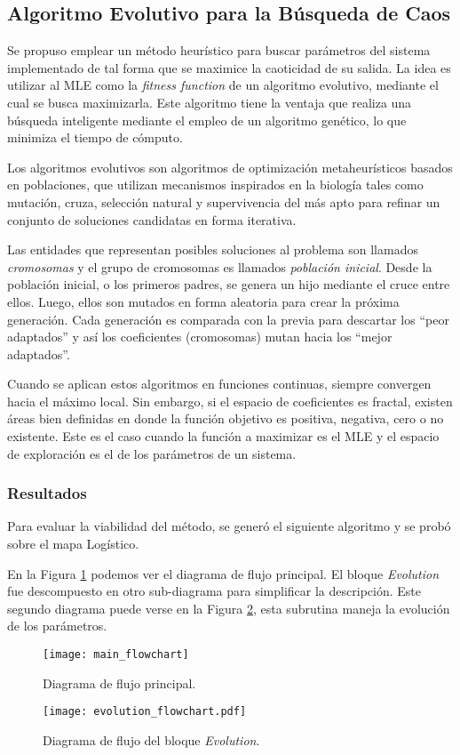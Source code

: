 \subsection{Algoritmo Evolutivo para la Búsqueda de Caos}

Se propuso emplear un método heurístico para buscar parámetros del sistema implementado de tal forma que se maximice la caoticidad de su salida.
La idea es utilizar al MLE como la \textit{fitness function} de un algoritmo evolutivo, mediante el cual se busca maximizarla.
Este algoritmo tiene la ventaja que realiza una búsqueda inteligente mediante el empleo de un algoritmo genético, lo que minimiza el tiempo de cómputo.

Los algoritmos evolutivos son algoritmos de optimización metaheurísticos basados en poblaciones, que utilizan mecanismos inspirados en la biología tales como mutación, cruza, selección natural y supervivencia del más apto para refinar un conjunto de soluciones candidatas en forma iterativa\cite{Weise2009}.

Las entidades que representan posibles soluciones al problema son llamados \textit{cromosomas} y el grupo de cromosomas es llamados \textit{población inicial}.
Desde la población inicial, o los primeros padres, se genera un hijo mediante el cruce entre ellos.
Luego, ellos son mutados en forma aleatoria para crear la próxima generación.
Cada generación es comparada con la previa para descartar los ``peor adaptados'' y así los coeficientes (cromosomas) mutan hacia los ``mejor adaptados''.

Cuando se aplican estos algoritmos en funciones continuas, siempre convergen hacia el máximo local.
Sin embargo, si el espacio de coeficientes es fractal, existen áreas bien definidas en donde la función objetivo es positiva, negativa, cero o no existente.
Este es el caso cuando la función a maximizar es el MLE y el espacio de exploración es el de los parámetros de un sistema.

\subsubsection{Resultados}

Para evaluar la viabilidad del método, se generó el siguiente algoritmo y se probó sobre el mapa Logístico.

En la Figura \ref{fig:diagramaflujo1} podemos ver el diagrama de flujo principal.
El bloque \textit{Evolution} fue descompuesto en otro sub-diagrama para simplificar la descripción.
Este segundo diagrama puede verse en la Figura \ref{fig:diagramaflujo2}, esta subrutina maneja la evolución de los parámetros.
%
\begin{figure}
	\centering
	\texttt{[image: main\_flowchart]}\\
	\caption{Diagrama de flujo principal.}
	\label{fig:diagramaflujo1}
\end{figure}
%
\begin{figure}
	\centering
	\texttt{[image: evolution\_flowchart.pdf]}\\
	\caption{Diagrama de flujo del bloque \textit{Evolution}.}\label{fig:diagramaflujo2}
\end{figure}

